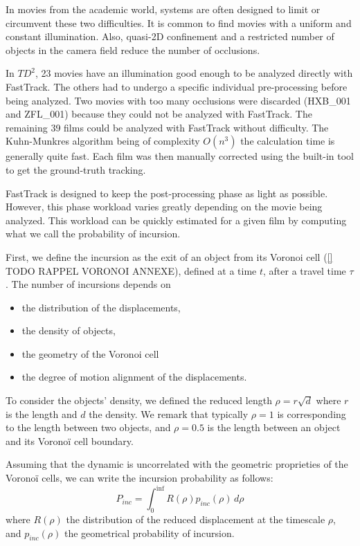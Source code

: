     In movies from the academic world, systems are often designed to limit or circumvent these two difficulties. It is common to find movies with a uniform and constant illumination. Also, quasi-2D confinement and a restricted number of objects in the camera field reduce the number of occlusions.

    In $TD^2$, 23 movies have an illumination good enough to be analyzed directly with FastTrack. The others had to undergo a specific individual pre-processing before being analyzed. Two movies with too many occlusions were discarded (HXB\_001 and ZFL\_001) because they could not be analyzed with FastTrack.
    The remaining 39 films could be analyzed with FastTrack without difficulty. The Kuhn-Munkres algorithm being of complexity $O(n^3)$ the calculation time is generally quite fast. Each film was then manually corrected using the built-in tool to get the ground-truth tracking.

    FastTrack is designed to keep the post-processing phase as light as possible. However, this phase workload varies greatly depending on the movie being analyzed. This workload can be quickly estimated for a given film by computing what we call the probability of incursion.

    First, we define the incursion as the exit of an object from its Voronoi cell (\ref{} TODO RAPPEL VORONOI ANNEXE), defined at a time $t$, after a travel time $\tau$. The number of incursions depends on
    \begin{itemize}
    \item the distribution of the displacements,
    \item the density of objects,
    \item the geometry of the Voronoi cell
    \item the degree of motion alignment of the displacements.
    \end{itemize}
    To consider the objects' density, we defined the reduced length $\rho=r\sqrt{d}$ where $r$ is the length and $d$ the density. We remark that typically $\rho=1$ is corresponding to the length between two objects, and $\rho=0.5$ is the length between an object and its Voronoï cell boundary.

    Assuming that the dynamic is uncorrelated with the geometric proprieties of the Voronoï cells, we can write the incursion probability as follows:
        $$P_{inc}=\int_{0}^{\inf} R(\rho)p_{inc}(\rho) \,d \rho$$
    where $R(\rho)$ the distribution of the reduced displacement at the timescale $\rho$, and $p_{inc}(\rho)$ the geometrical probability of incursion.

